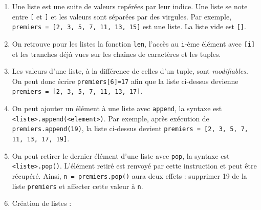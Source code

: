 \documentclass[11pt,a4paper]{article}
\begin{document}
\begin{tcolorbox}[left=0cm,title=\bf{\faPython \; Listes},colbacktitle=cfond]
    \begin{enumerate}
        \item[\ding{182}] Une liste est une suite de valeurs repérées par leur indice. Une liste se note entre {\tt [} et {\tt]} et les valeurs sont séparées par des virgules. Par exemple, \texttt{premiers = [2, 3, 5, 7, 11, 13, 15]} est une liste. La liste vide est {\tt []}.
        \item[\ding{183}] On retrouve pour les listes la fonction {\tt len}, l'accès au {\tt i}-ème élément avec {\tt [i]} et les tranches déjà vues sur les chaînes de caractères et les tuples.
        \item[\ding{184}] Les valeurs d'une liste, à la différence de celles d'un tuple, sont \textit{modifiables}. On peut donc écrire \texttt{premiers[6]=17} afin que la liste ci-dessus devienne \texttt{premiers = [2, 3, 5, 7, 11, 13, 17]}.
        \item[\ding{185}] On peut ajouter un élément à une liste avec {\tt append}, la syntaxe est {\tt <liste>.append(<element>)}. Par exemple, après exécution de \texttt{premiers.append(19)}, la liste ci-dessus devient \texttt{premiers = [2, 3, 5, 7, 11, 13, 17, 19]}.
        \item[\ding{186}] On peut retirer le dernier élément d'une liste avec {\tt pop}, la syntaxe est {\tt <liste>.pop()}. L'élément retiré est renvoyé par cette instruction et peut être récupéré. Ainsi, \texttt{n = premiers.pop()} aura deux effets : supprimer 19 de la liste {\tt premiers} et affecter cette valeur à {\tt n}.
        \item[\ding{187}] Création de listes :
    \end{enumerate}
\end{tcolorbox}
\end{document}
